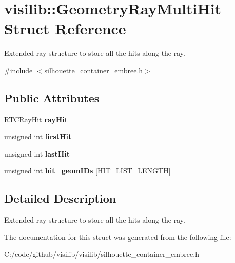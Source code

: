 \hypertarget{structvisilib_1_1_geometry_ray_multi_hit}{}\section{visilib\+::Geometry\+Ray\+Multi\+Hit Struct Reference}
\label{structvisilib_1_1_geometry_ray_multi_hit}


Extended ray structure to store all the hits along the ray.  




{\ttfamily \#include $<$silhouette\+\_\+container\+\_\+embree.\+h$>$}

\subsection*{Public Attributes}
\begin{DoxyCompactItemize}
\item 
\mbox{\label{structvisilib_1_1_geometry_ray_multi_hit_afae4c896c73b645bd216321622f6a92b}} 
R\+T\+C\+Ray\+Hit {\bfseries ray\+Hit}
\item 
\mbox{\label{structvisilib_1_1_geometry_ray_multi_hit_ad5d5b5118b46c96eecb5a53270ff351d}} 
unsigned int {\bfseries first\+Hit}
\item 
\mbox{\label{structvisilib_1_1_geometry_ray_multi_hit_abb8d1627292c4e26f86eb376cb931fdd}} 
unsigned int {\bfseries last\+Hit}
\item 
\mbox{\label{structvisilib_1_1_geometry_ray_multi_hit_a56b29113dfe810532eaf05f71aae5b09}} 
unsigned int {\bfseries hit\+\_\+geom\+I\+Ds} \mbox{[}H\+I\+T\+\_\+\+L\+I\+S\+T\+\_\+\+L\+E\+N\+G\+TH\mbox{]}
\end{DoxyCompactItemize}


\subsection{Detailed Description}
Extended ray structure to store all the hits along the ray. 

The documentation for this struct was generated from the following file\+:\begin{DoxyCompactItemize}
\item 
C\+:/code/github/visilib/visilib/silhouette\+\_\+container\+\_\+embree.\+h\end{DoxyCompactItemize}
